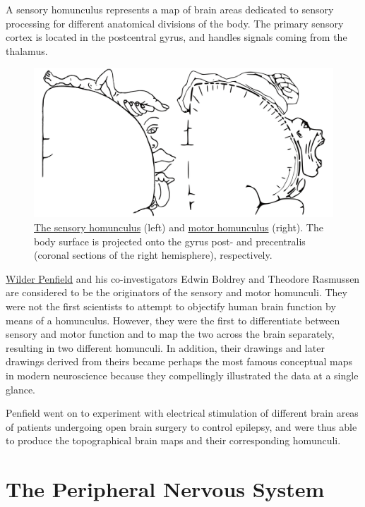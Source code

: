 A sensory homunculus represents a map of brain areas dedicated to sensory processing for different anatomical divisions of the body. The primary sensory cortex is located in the postcentral gyrus, and handles signals coming from the thalamus.



\begin{figure}

{\centering \includegraphics[width=0.7\linewidth]{./figures/cns/motor_and_sensory_homunculus} 

}

\caption{\href{https://commons.wikimedia.org/wiki/File:Sensory_homunculus.svg}{The sensory homunculus} (left) and \href{https://commons.wikimedia.org/wiki/File:Motor_homunculus.svg}{motor homunculus} (right). The body surface is projected onto the gyrus post- and precentralis (coronal sections of the right hemisphere), respectively.}\label{fig:homunculus}
\end{figure}

\href{https://en.wikipedia.org/wiki/Wilder_Penfield}{Wilder Penfield} and his co-investigators Edwin Boldrey and Theodore Rasmussen are considered to be the originators of the sensory and motor homunculi. They were not the first scientists to attempt to objectify human brain function by means of a homunculus. However, they were the first to differentiate between sensory and motor function and to map the two across the brain separately, resulting in two different homunculi. In addition, their drawings and later drawings derived from theirs became perhaps the most famous conceptual maps in modern neuroscience because they compellingly illustrated the data at a single glance.

Penfield went on to experiment with electrical stimulation of different brain areas of patients undergoing open brain surgery to control epilepsy, and were thus able to produce the topographical brain maps and their corresponding homunculi.

\hypertarget{the-peripheral-nervous-system}{%
\chapter{The Peripheral Nervous System}\label{the-peripheral-nervous-system}}

